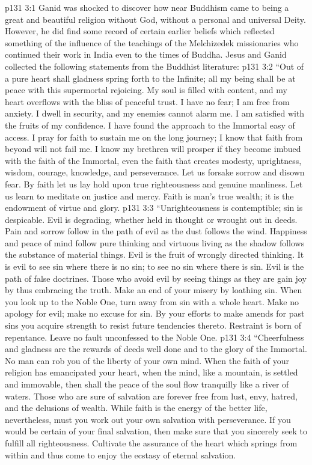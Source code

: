 \vs p131 3:1 Ganid was shocked to discover how near Buddhism came to being a great and beautiful religion without God, without a personal and universal Deity. However, he did find some record of certain earlier beliefs which reflected something of the influence of the teachings of the Melchizedek missionaries who continued their work in India even to the times of Buddha. Jesus and Ganid collected the following statements from the Buddhist literature:
\vs p131 3:2 \pc “Out of a pure heart shall gladness spring forth to the Infinite; all my being shall be at peace with this supermortal rejoicing. My soul is filled with content, and my heart overflows with the bliss of peaceful trust. I have no fear; I am free from anxiety. I dwell in security, and my enemies cannot alarm me. I am satisfied with the fruits of my confidence. I have found the approach to the Immortal easy of access. I pray for faith to sustain me on the long journey; I know that faith from beyond will not fail me. I know my brethren will prosper if they become imbued with the faith of the Immortal, even the faith that creates modesty, uprightness, wisdom, courage, knowledge, and perseverance. Let us forsake sorrow and disown fear. By faith let us lay hold upon true righteousness and genuine manliness. Let us learn to meditate on justice and mercy. Faith is man’s true wealth; it is the endowment of virtue and glory.
\vs p131 3:3 “Unrighteousness is contemptible; sin is despicable. Evil is degrading, whether held in thought or wrought out in deeds. Pain and sorrow follow in the path of evil as the dust follows the wind. Happiness and peace of mind follow pure thinking and virtuous living as the shadow follows the substance of material things. Evil is the fruit of wrongly directed thinking. It is evil to see sin where there is no sin; to see no sin where there is sin. Evil is the path of false doctrines. Those who avoid evil by seeing things as they are gain joy by thus embracing the truth. Make an end of your misery by loathing sin. When you look up to the Noble One, turn away from sin with a whole heart. Make no apology for evil; make no excuse for sin. By your efforts to make amends for past sins you acquire strength to resist future tendencies thereto. Restraint is born of repentance. Leave no fault unconfessed to the Noble One.
\vs p131 3:4 “Cheerfulness and gladness are the rewards of deeds well done and to the glory of the Immortal. No man can rob you of the liberty of your own mind. When the faith of your religion has emancipated your heart, when the mind, like a mountain, is settled and immovable, then shall the peace of the soul flow tranquilly like a river of waters. Those who are sure of salvation are forever free from lust, envy, hatred, and the delusions of wealth. While faith is the energy of the better life, nevertheless, must you work out your own salvation with perseverance. If you would be certain of your final salvation, then make sure that you sincerely seek to fulfill all righteousness. Cultivate the assurance of the heart which springs from within and thus come to enjoy the ecstasy of eternal salvation.
